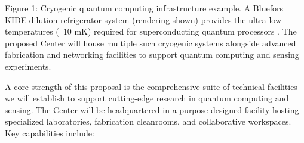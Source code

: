 \documentclass[12pt]{article}
\begin{document}
Figure 1: Cryogenic quantum computing infrastructure example. A Bluefors KIDE dilution refrigerator system (rendering shown) provides the ultra-low temperatures (~10 mK) required for superconducting quantum processors . The proposed Center will house multiple such cryogenic systems alongside advanced fabrication and networking facilities to support quantum computing and sensing experiments.



A core strength of this proposal is the comprehensive suite of technical facilities we will establish to support cutting-edge research in quantum computing and sensing. The Center will be headquartered in a purpose-designed facility hosting specialized laboratories, fabrication cleanrooms, and collaborative workspaces. Key capabilities include:
\end{document}
